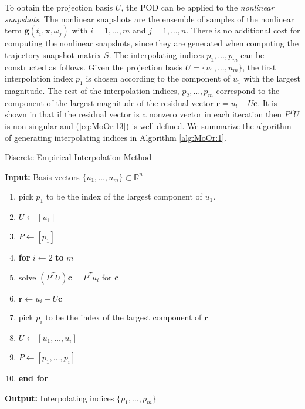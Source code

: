 {\edit To obtain the projection basis $U$, the POD can be applied to the \emph{nonlinear snapshots}. The nonlinear snapshots are the ensemble of samples of the nonlinear term $\mathbf g(t_i,\mathbf x, \omega_j)$ with $i=1,\dots,m$ and $j=1,\dots,n$}. There is no additional cost for computing the nonlinear snapshots, since they are generated when computing the trajectory snapshot matrix $S$. The interpolating indices $p_1,\dots,p_m$ can be constructed as follows. Given the projection basis $U = \{u_1,\dots,u_m\}$, the first interpolation index $p_1$ is chosen according to the component of $u_1$ with the largest magnitude. The rest of the interpolation indices, $p_2,\dots,p_m$ correspond to the component of the largest magnitude of the residual vector $\mathbf r = u_l - U \mathbf c$. It is shown in \cite{Chaturantabut:2010cz} that if the residual vector is a nonzero vector in each iteration then $P^TU$ is non-singular and (\ref{eq:MoOr:13}) is well defined. We summarize the algorithm of generating interpolating indices in Algorithm \ref{alg:MoOr:1}.

\begin{algorithm} 
\caption{Discrete Empirical Interpolation Method} \label{alg:MoOr:1}
{\bf Input:}  Basis vectors $\{u_1,\dots , u_m\}\subset \mathbb R^n$
\begin{enumerate}
\item pick $p_1$ to be the index of the largest component of $u_1$.
\item $U \leftarrow [u_1]$
\item $P \leftarrow [p_1]$
\item \textbf{for} $i\leftarrow 2$ \textbf{to} $m$
\item \hspace{0.5cm} solve $(P^TU)\mathbf c = P^T u_i$ for $\mathbf c$
\item \hspace{0.5cm} $\mathbf r \leftarrow u_i - U\mathbf c$
\item \hspace{0.5cm} pick $p_i$ to be the index of the largest component of $\mathbf r$
\item \hspace{0.5cm} $U \leftarrow [u_1,\dots,u_i]$
\item \hspace{0.5cm} $P \leftarrow [p_1,\dots,p_i]$
\item \textbf{end for}
\end{enumerate}
\vspace{0.5cm}
{\bf Output:} Interpolating indices $\{p_1,\dots,p_m\}$
\end{algorithm}


